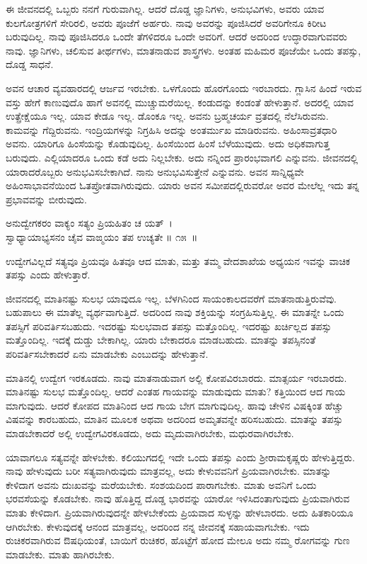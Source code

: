 ಈ ಜೀವನದಲ್ಲಿ ಒಬ್ಬರು ನನಗೆ ಗುರುವಾಗಿಲ್ಲ. ಆದರೆ ದೊಡ್ಡ ಜ್ಞಾನಿಗಳು, ಅನುಭವಿಗಳು, ಅವರು ಯಾವ ಕುಲಗೋತ್ರಗಳಿಗೆ ಸೇರಿರಲಿ, ಅವರು ಪೂಜೆಗೆ ಅರ್ಹರು. ನಾವು ಅವರನ್ನು ಪೂಜಿಸಿದರೆ ಅವರಿಗೇನೂ ಕಿರೀಟ ಬರುವುದಿಲ್ಲ. ನಾವು ಪೂಜಿಸಿದರೂ ಒಂದೇ ತೆಗಳಿದರೂ ಒಂದೇ ಅವರಿಗೆ. ಆದರೆ ಅದರಿಂದ ಉದ್ಧಾರವಾಗುವವರು ನಾವು. ಜ್ಞಾನಿಗಳು, ಚಲಿಸುವ ತೀರ್ಥಗಳು, ಮಾತನಾಡುವ ಶಾಸ್ತ್ರಗಳು. ಅಂತಹ ಮಹಿಮರ ಪೂಜೆಯೇ ಒಂದು ತಪಸ್ಸು, ದೊಡ್ಡ ಸಾಧನೆ. 

ಅವನ ಆಚಾರ ವ್ಯವಹಾರದಲ್ಲಿ ಆರ್ಜವ ಇರಬೇಕು. ಒಳಗೊಂದು ಹೊರಗೊಂದು ಇರ\-ಬಾರದು. ಗ್ಲಾಸಿನ ಹಿಂದೆ ಇರುವ ವಸ್ತು ಹೇಗೆ ಕಾಣುವುದೊ ಹಾಗೆ ಅವನಲ್ಲಿ ಮುಚ್ಚುಮರೆಯಿಲ್ಲ. ಕಂಡುದನ್ನು ಕಂಡಂತೆ ಹೇಳುತ್ತಾನೆ. ಅದರಲ್ಲಿ ಯಾವ ಉತ್ಪ್ರೇಕ್ಷೆಯೂ ಇಲ್ಲ. ಯಾವ ಕೇಡೂ ಇಲ್ಲ. ಡೊಂಕೂ ಇಲ್ಲ. ಅವನು ಬ್ರಹ್ಮಚರ್ಯ ವ್ರತದಲ್ಲಿ ನೆಲೆಸಿರುವನು. ಕಾಮವನ್ನು ಗೆದ್ದಿರುವನು. ಇಂದ್ರಿಯಗಳನ್ನು ನಿಗ್ರಹಿಸಿ ಅದನ್ನು ಅಂತರ್ಮುಖ ಮಾಡಿರುವನು. ಅಹಿಂಸಾವ್ರತಧಾರಿ ಅವನು. ಯಾರಿಗೂ ಹಿಂಸೆಯನ್ನು ಕೊಡುವುದಿಲ್ಲ. ಹಿಂಸೆಯಿಂದ ಹಿಂಸೆ ಬೆಳೆಯುವುದು. ಅದು ಅಧಿಕವಾಗುತ್ತ ಬರುವುದು. ಎಲ್ಲಿಯಾದರೂ ಒಂದು ಕಡೆ ಅದು ನಿಲ್ಲಬೇಕು. ಅದು ನನ್ನಿಂದ ಪ್ರಾರಂಭವಾಗಲಿ ಎನ್ನುವನು. ಜೀವನದಲ್ಲಿ ಯಾರಾದರೊಬ್ಬರು ಅನುಭವಿಸಬೇಕಾಗಿದೆ. ನಾನು ಅನುಭವಿಸುತ್ತೇನೆ ಎನ್ನುವನು. ಅವನ ಸಾನ್ನಿಧ್ಯವೇ ಅಹಿಂಸಾಭಾವನೆಯಿಂದ ಓತಪ್ರೋತವಾಗಿರುವುದು. ಯಾರು ಅವನ ಸಮೀಪದಲ್ಲಿರುವರೋ ಅವರ ಮೇಲೆಲ್ಲ ಇದು ತನ್ನ ಪ್ರಭಾವವನ್ನು ಬೀರುವುದು.

\begin{shloka}
ಅನುದ್ವೇಗಕರಂ ವಾಕ್ಯಂ ಸತ್ಯಂ ಪ್ರಿಯಹಿತಂ ಚ ಯತ್~।\\ಸ್ವಾಧ್ಯಾಯಾಭ್ಯಸನಂ ಚೈವ ವಾಙ್ಮಯಂ ತಪ ಉಚ್ಯತೇ \hfill॥ ೧೫~॥
\end{shloka}

\begin{artha}
ಉದ್ವೇಗವಿಲ್ಲದೆ ಸತ್ಯವೂ ಪ್ರಿಯವೂ ಹಿತವೂ ಆದ ಮಾತು, ಮತ್ತು ತಮ್ಮ ವೇದಶಾಖೆಯ ಅಧ್ಯಯನ ಇವನ್ನು ವಾಚಿಕ ತಪಸ್ಸು ಎಂದು ಹೇಳುತ್ತಾರೆ.
\end{artha}

ಜೀವನದಲ್ಲಿ ಮಾತಿನಷ್ಟು ಸುಲಭ ಯಾವುದೂ ಇಲ್ಲ. ಬೆಳಗಿನಿಂದ ಸಾಯಂಕಾಲದವರೆಗೆ ಮಾತನಾಡುತ್ತಿರುವೆವು. ಬಹುಪಾಲು ಈ ಮಾತೆಲ್ಲ ವ್ಯರ್ಥವಾಗುತ್ತಿದೆ. ಅದರಿಂದ ನಾವು ಶಕ್ತಿಯನ್ನು ಸಂಗ್ರಹಿಸುತ್ತಿಲ್ಲ. ಈ ಮಾತನ್ನೇ ಒಂದು ತಪಸ್ಸಿಗೆ ಪರಿವರ್ತಿಸಬಹುದು. ಇದರಷ್ಟು ಸುಲಭವಾದ ತಪಸ್ಸು ಮತ್ತೊಂದಿಲ್ಲ. ಇದರಷ್ಟು ಖರ್ಚಿಲ್ಲದ ತಪಸ್ಸು ಮತ್ತೊಂದಿಲ್ಲ. ಇದಕ್ಕೆ ದುಡ್ಡು ಬೇಕಾಗಿಲ್ಲ. ಯಾರು ಬೇಕಾದರೂ ಮಾಡಬಹುದು. ಮಾತನ್ನು ತಪಸ್ಸಿನಂತೆ ಪರಿವರ್ತಿಸಬೇಕಾದರೆ ಏನು ಮಾಡಬೇಕು ಎಂಬುದನ್ನು ಹೇಳುತ್ತಾನೆ.

ಮಾತಿನಲ್ಲಿ ಉದ್ವೇಗ ಇರಕೂಡದು. ನಾವು ಮಾತನಾಡುವಾಗ ಅಲ್ಲಿ ಕೋಪವಿರಬಾರದು. ಮಾತ್ಸರ್ಯ ಇರಬಾರದು. ಮಾತಿನಷ್ಟು ಸುಲಭ ಮತ್ತೊಂದಿಲ್ಲ. ಆದರೆ ಎಂತಹ ಗಾಯವನ್ನು ಮಾಡುವುದು ಮಾತು? ಕತ್ತಿಯಿಂದ ಆದ ಗಾಯ ಮಾಗುವುದು. ಆದರೆ ಕೋಪದ ಮಾತಿನಿಂದ ಆದ ಗಾಯ ಬೇಗ ಮಾಗುವುದಿಲ್ಲ. ಹಾವು ಚೇಳಿನ ವಿಷಕ್ಕಿಂತ ಹೆಚ್ಚು ವಿಷವನ್ನು ಕಾರಬಹುದು, ಮಾತಿನ ಮೂಲಕ ಅಥವಾ ಅದರಿಂದ ಅಮೃತವನ್ನೇ ಹರಿಸಬಹುದು. ಮಾತನ್ನು ತಪಸ್ಸು ಮಾಡಬೇಕಾದರೆ ಅಲ್ಲಿ ಉದ್ವೇಗವಿರಕೂಡದು, ಅದು ಮೃದುವಾಗಿರಬೇಕು, ಮಧುರವಾಗಿರಬೇಕು.

ಯಾವಾಗಲೂ ಸತ್ಯವನ್ನೇ ಹೇಳಬೇಕು. ಕಲಿಯುಗದಲ್ಲಿ ಇದೇ ಒಂದು ತಪಸ್ಸು ಎಂದು ಶ‍್ರೀರಾಮಕೃಷ್ಣರು ಹೇಳುತ್ತಿದ್ದರು. ನಾವು ಹೇಳುವುದು ಬರೀ ಸತ್ಯವಾಗಿರುವುದು ಮಾತ್ರವಲ್ಲ, ಅದು ಕೇಳುವವನಿಗೆ ಪ್ರಿಯವಾಗಿರಬೇಕು. ಮಾತನ್ನು ಕೇಳಿದಾಗ ಅವನು ದುಃಖವನ್ನು ಮರೆಯಬೇಕು. ಸಂಶಯದಿಂದ ಪಾರಾಗಬೇಕು. ಮಾತು ಅವನಿಗೆ ಒಂದು ಭರವಸೆಯನ್ನು ಕೊಡಬೇಕು. ನಾವು ಹೊತ್ತಿದ್ದ ದೊಡ್ಡ ಭಾರವನ್ನು ಯಾರೋ ಇಳಿಸಿದಂತಾಗುವುದು ಪ್ರಿಯವಾಗಿರುವ ಮಾತು ಕೇಳಿದಾಗ. ಪ್ರಿಯವಾಗಿರುವುದನ್ನೇ ಹೇಳಬೇಕೆಂದು ಪ್ರಿಯವಾದ ಸುಳ್ಳನ್ನು ಹೇಳಬಾರದು. ಅದು ಹಿತಕಾರಿಯೂ ಆಗಿರಬೇಕು. ಕೇಳುವುದಕ್ಕೆ ಆನಂದ ಮಾತ್ರವಲ್ಲ, ಅದರಿಂದ ನನ್ನ ಜೀವನಕ್ಕೆ ಸಹಾಯವಾಗಬೇಕು. ಇದು ರುಚಿಕರವಾಗಿರುವ ಔಷಧಿಯಂತೆ, ಬಾಯಿಗೆ ರುಚಿಕರ, ಹೊಟ್ಟೆಗೆ ಹೋದ ಮೇಲೂ ಅದು ನಮ್ಮ ರೋಗವನ್ನು ಗುಣ ಮಾಡಬೇಕು. ಮಾತು ಹಾಗಿರಬೇಕು.

